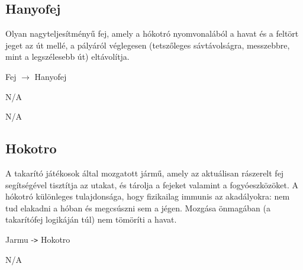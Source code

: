 \subsection{Hanyofej}
\begin{class-template-responsibility}
   Olyan nagyteljesítményű fej, amely a hókotró nyomvonalából a havat és a feltört jeget az út mellé, a pályáról véglegesen (tetszőleges sávtávolságra, messzebbre, mint a legszélesebb út) eltávolítja.
\end{class-template-responsibility}
\begin{class-template-baseclass}
    Fej $\rightarrow$ Hanyofej
\end{class-template-baseclass}
\begin{class-template-interface}
    N/A
\end{class-template-interface}
\begin{class-template-attribute}
    N/A
\end{class-template-attribute}
\begin{class-template-method}
\end{class-template-method}

\subsection{Hokotro}
\begin{class-template-responsibility}
    A takarító játékosok által mozgatott jármű, amely az aktuálisan rászerelt fej segítségével tisztítja az utakat, és tárolja a fejeket valamint a fogyóeszközöket. A hókotró különleges tulajdonsága, hogy fizikailag immunis az akadályokra: nem tud elakadni a hóban és megcsúszni sem a jégen. Mozgása önmagában (a takarítófej logikáján túl) nem tömöríti a havat.
\end{class-template-responsibility}
\begin{class-template-baseclass}
    Jarmu -\texttt{>} Hokotro
\end{class-template-baseclass}
\begin{class-template-interface}
    N/A
\end{class-template-interface}
\begin{class-template-attribute}
\end{class-template-attribute}
\begin{class-template-method}
\end{class-template-method}

